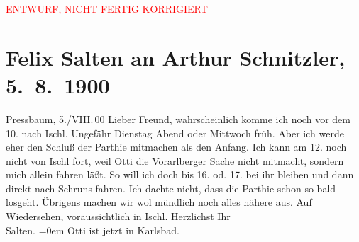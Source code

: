
\begin{center}
            \textcolor{red}{ENTWURF, NICHT FERTIG KORRIGIERT}
                      \end{center}
            
         
         \renewcommand{\erwaehntePersonen}{Personen: Ottilie Salten}
         \renewcommand{\erwaehnteOrte}{Orte: Bad Ischl, Karlsbad, Pressbaum, Schruns, Vorarlberg}
         \renewcommand{\erwaehnteWerke}{}
               \section[Felix Salten an Arthur Schnitzler, 5. 8. 1900]{ Felix Salten an Arthur Schnitzler, 5. 8. 1900}\nopagebreak{}\rehead{ }\begin{ledgroupsized}[t]{13cm}\normalsize\beginnumbering \toendnotes[C]{\smallbreak\pagebreak[2]} 
\pstart
           \raggedleft{}{\pb}Pressbaum, 5./VIII. 00\pend
           \pstart
           Lieber Freund, wahrscheinlich komme ich noch vor dem
                  10. nach Ischl. Ungefähr
                  Dienstag Abend oder Mittwoch früh. Aber ich werde eher
               den Schluß der Parthie mitmachen als den Anfang. Ich kann am 12. noch
               nicht von Ischl fort, weil Otti die Vorarlberger Sache nicht
               mitmacht, sondern mich allein fahren läßt. So will ich doch bis 16. od.
                  17. bei ihr bleiben und dann direkt nach {\pb}Schruns fahren. Ich dachte nicht, dass die Parthie schon
               so bald losgeht. Übrigens machen wir wol mündlich noch alles nähere aus. \pend
           \pstart
           Auf Wiedersehen, voraussichtlich in Ischl. \pend
           \pstart
           Herzlichst Ihr {\\[\baselineskip]}\spacefill\mbox{Salten.}\pend
           \leftskip=0em{}\pstart
           \noindent{}Otti ist jetzt in Karlsbad. \pend
           
         
         \endnumbering{}\end{ledgroupsized}\begin{anhang}\end{anhang}\newcommand{\dateiname}{L03307}\newcommand{\titel}{Felix Salten an Arthur Schnitzler, 5. 8. 1900}\newcommand{\editorInnen}{Martin Anton Müller und Laura Untner}
      